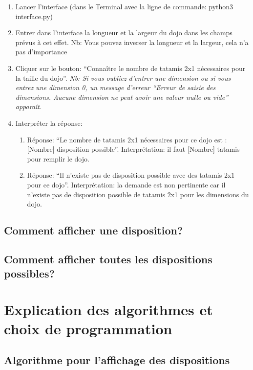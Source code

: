 \begin{enumerate}
    \item Lancer l’interface (dans le Terminal avec la ligne de commande: python3 interface.py)
    \item Entrer dans l’interface la longueur et la largeur du dojo dans les champs prévus à cet effet. Nb: Vous pouvez inverser la longueur et la largeur, cela n’a pas d’importance
    \item Cliquer sur le bouton: “Connaître le nombre de tatamis 2x1 nécessaires pour la taille du dojo”.
          \emph{Nb: Si vous oubliez d’entrer une dimension ou si vous entrez une dimension 0, un message d’erreur “Erreur de saisie des dimensions. Aucune dimension ne peut avoir une valeur nulle ou vide” apparaît.
          }
    \item Interpréter la réponse:
          \begin{enumerate}
              \item Réponse: “Le nombre de tatamis 2x1 nécessaires pour ce dojo est :  [Nombre] disposition possible”.
                    Interprétation: il faut [Nombre] tatamis pour remplir le dojo.
              \item Réponse: “Il n'existe pas de disposition possible avec des tatamis 2x1 pour ce dojo”.
                    Interprétation: la demande est non pertinente car il n’existe pas de disposition possible de tatamis 2x1 pour les dimensions du dojo.
          \end{enumerate}
\end{enumerate}


\subsection{Comment afficher une disposition?}

\subsection{Comment afficher toutes les dispositions possibles?}

\section{Explication des algorithmes et choix de programmation}

\subsection{Algorithme pour l’affichage des dispositions}

